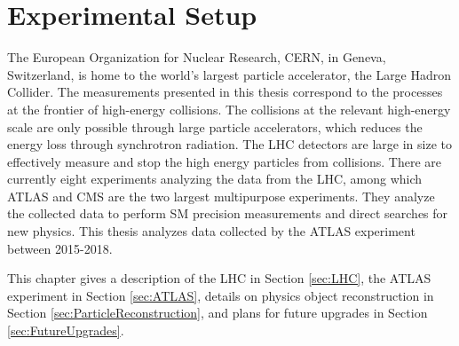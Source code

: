 \part{Experimental Setup}
\label{sec:Experiment}

The European Organization for Nuclear Research, CERN, in Geneva, Switzerland, is home to the world's largest particle accelerator, the Large Hadron Collider. The measurements presented in this thesis correspond to the processes at the frontier of high-energy collisions. The collisions at the relevant high-energy scale are only possible through large particle accelerators, which reduces the energy loss through synchrotron radiation. The LHC detectors are large in size to effectively measure and stop the high energy particles from collisions. There are currently eight experiments analyzing the data from the LHC, among which ATLAS and CMS are the two largest multipurpose experiments. They analyze the collected data to perform SM precision measurements and direct searches for new physics. This thesis analyzes data collected by the ATLAS experiment between 2015-2018.

This chapter gives a description of the LHC in Section \ref{sec:LHC}, the ATLAS experiment in Section \ref{sec:ATLAS}, details on physics object reconstruction in Section \ref{sec:ParticleReconstruction}, and plans for future upgrades in Section \ref{sec:FutureUpgrades}. 